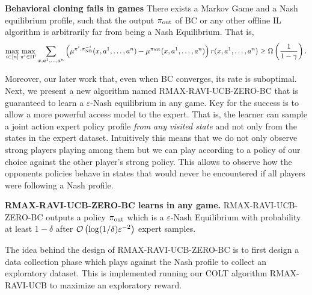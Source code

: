 \documentclass{article}
\begin{document}
\begin{tcolorbox}[
    colback=orange!10!white,
    colframe=orange!80!black,
    width=\linewidth
  ]
\begin{theorem} \textbf{Behavioral cloning fails in games }
There exists a Markov Game and a Nash equilibrium profile, such that the output $\pi_{\mathrm{out}}$ of BC or any other offline IL algorithm is
arbitrarily far from being a Nash Equilibrium. That is,
$$\max_{i\in[n]}\max_{\pi^i \in \Pi^i}\sum_{x,a^1, \dots,a^n} \left({\mu^{\pi^i, \pi^{-i}_{\mathrm{NE}}}(x,a^1, \dots,a^n) - \mu^{\pi_{\mathrm{NE}}}(x,a^1, \dots,a^n)}\right)r(x,a^1, \dots,a^n) \geq \Omega\left({\frac{1}{1-\gamma}}\right).$$
\end{theorem}
\end{tcolorbox}
Moreover, our later work  that, even when BC converges, its rate is suboptimal.
Next, we present a new algorithm named RMAX-RAVI-UCB-ZERO-BC that is guaranteed to learn a $\varepsilon$-Nash equilibrium in any game. Key for the success is to allow a more powerful access model to the expert.
That is, the learner can sample a joint action expert policy profile \emph{from any visited state} and not only from the states in the expert dataset.
Intuitively this means that we do not only observe strong players playing among them but we can play according to a policy of our choice against the other player's strong policy. 
This allows to observe how the opponents policies behave in states that would never be encountered if all players were following a Nash profile.
\begin{tcolorbox}[
    colback=orange!10!white,
    colframe=orange!80!black,
    width=\linewidth
  ]
\begin{theorem} \textbf{RMAX-RAVI-UCB-ZERO-BC  learns in any game.}
    RMAX-RAVI-UCB-ZERO-BC outputs a policy $\pi_{\mathrm{out}}$ which is a $\varepsilon$-Nash Equilibrium with probability at least $1-\delta$ after 
    $\mathcal{O}\left({\log(1/\delta) \varepsilon^{-2}}\right)$ expert samples.
\end{theorem}
\end{tcolorbox}
The idea behind the design of RMAX-RAVI-UCB-ZERO-BC is to first design a data collection phase 
which plays against the Nash profile to collect an exploratory dataset. This is implemented running our COLT algorithm RMAX-RAVI-UCB  to maximize an exploratory reward.
\end{document}
